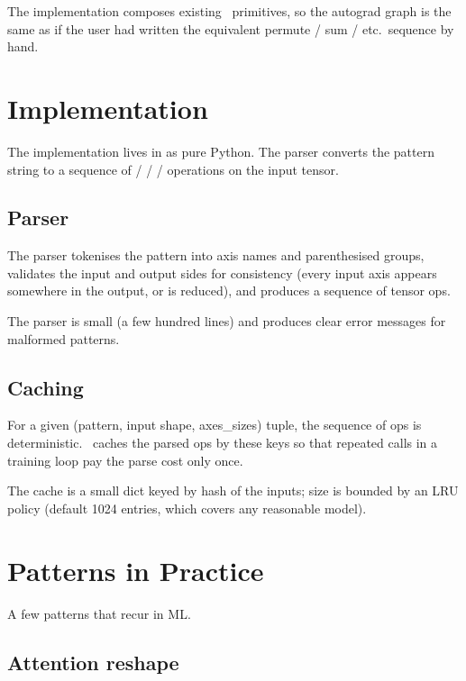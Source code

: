 The implementation composes existing \Lucid\ primitives, so the
autograd graph is the same as if the user had written the
equivalent permute / sum / etc.\ sequence by hand.

\section{Implementation}
\label{sec:einops:impl}

The implementation lives in  as pure Python.
The parser converts the pattern string to a sequence of
 /  /  / 
operations on the input tensor.

\subsection{Parser}
\label{ssec:einops:parser}

The parser tokenises the pattern into axis names and
parenthesised groups, validates the input and output sides for
consistency (every input axis appears somewhere in the output, or
is reduced), and produces a sequence of tensor ops.

The parser is small (a few hundred lines) and produces clear
error messages for malformed patterns.

\subsection{Caching}
\label{ssec:einops:caching}

For a given (pattern, input shape, axes\_sizes) tuple, the
sequence of ops is deterministic. \Lucid\ caches the parsed ops
by these keys so that repeated calls in a training loop pay the
parse cost only once.

The cache is a small dict keyed by hash of the inputs; size is
bounded by an LRU policy (default 1024 entries, which covers any
reasonable model).

\section{Patterns in Practice}
\label{sec:einops:patterns_in_practice}

A few patterns that recur in ML.

\subsection{Attention reshape}
\label{ssec:einops:attention_reshape}

